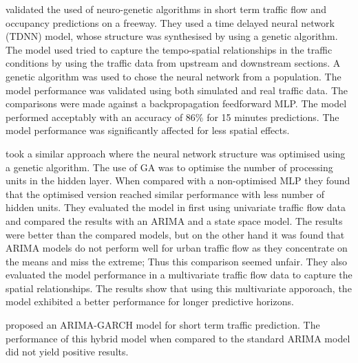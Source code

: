 \citet{abdulhai2002short} validated the used of neuro-genetic algorithms in short term traffic flow and
occupancy predictions on a freeway. They used a time delayed neural network (TDNN) model, whose
structure was synthesised by using a genetic algorithm. The model used tried to capture the
tempo-spatial relationships in the traffic conditions by using the traffic data from upstream and
downstream sections. A genetic algorithm was used to chose the neural network from a population. The
model performance was validated using both simulated and real traffic data. The comparisons were made
against a backpropagation feedforward MLP. The model performed acceptably with an accuracy of 86\% for
15 minutes predictions. The model performance was significantly affected for less spatial effects.

\citet{vlahogianni2005optimized} took a similar approach where the neural network structure was optimised
using a genetic algorithm. The use of GA was to optimise the number of processing units in the hidden
layer. When compared with a non-optimised MLP they found that the optimised version reached similar
performance with less number of hidden units. They evaluated the model in first using univariate traffic
flow data and compared the results with an ARIMA and a state space model. The results were better than
the compared models, but on the other hand it was found that ARIMA models do not perform well for urban
traffic flow as they concentrate on the means and miss the extreme; Thus this comparison seemed unfair.
They also evaluated the model performance in a multivariate traffic flow data to capture the spatial
relationships. The results show that using this multivariate apporoach, the model exhibited a better
performance for longer predictive horizons.


\citet{chen2011short} proposed an ARIMA-GARCH model for short term traffic prediction. The
performance of this hybrid model when compared to the standard ARIMA model did not yield positive
results.


